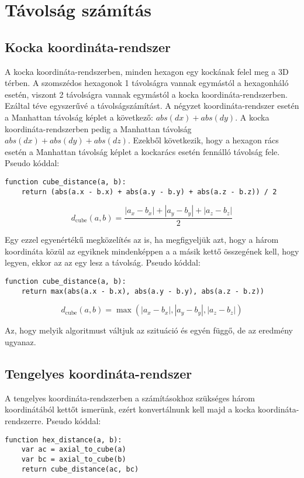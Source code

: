 \chapter{Távolság számítás}

\section{Kocka koordináta-rendszer}

A kocka koordináta-rendszerben, minden hexagon egy kockának felel meg a 3D térben. A szomszédos hexagonok 1 távolságra vannak egymástól a hexagonháló esetén, viszont 2 távolságra vannak egymástól a kocka koordináta-rendszerben. Ezáltal téve egyszerűvé a távolságszámítást. A négyzet koordináta-rendszer esetén a Manhattan távolság képlet a következő: $abs(dx) + abs(dy)$. A kocka koordináta-rendszerben pedig a Manhattan távolság $abs(dx) + abs(dy) + abs(dz)$. Ezekből következik, hogy a hexagon rács esetén a Manhattan távolság képlet a kockarács esetén fennálló távolság fele.
\newline
\newline Pseudo kóddal:
\begin{verbatim}
function cube_distance(a, b):
    return (abs(a.x - b.x) + abs(a.y - b.y) + abs(a.z - b.z)) / 2
\end{verbatim}    

$$
d_{\text{cube}}(a, b) =
\dfrac{|a_x - b_x| + |a_y - b_y| + |a_z - b_z|}{2}
$$

\noindent Egy ezzel egyenértékű megközelítés az is, ha megfigyeljük azt, hogy a három koordináta közül az egyiknek mindenképpen a a másik kettő összegének kell, hogy legyen, ekkor az az egy lesz a távolság. 
\newline
\newline Pseudo kóddal:
\begin{verbatim}
function cube_distance(a, b):
    return max(abs(a.x - b.x), abs(a.y - b.y), abs(a.z - b.z))
\end{verbatim}

$$
d_{\text{cube}}(a, b) =
\max(
|a_x - b_x|, |a_y - b_y|, |a_z - b_z|
)
$$

\noindent Az, hogy melyik algoritmust váltjuk az szituáció és egyén függő, de az eredmény ugyanaz.

\section{Tengelyes koordináta-rendszer}

A tengelyes koordináta-rendszerben a számításokhoz szükséges három koordinátából kettőt ismerünk, ezért konvertálnunk kell majd a kocka koordináta-rendszerre.
\newline
\newline Pseudo kóddal:
\begin{verbatim}
function hex_distance(a, b):
    var ac = axial_to_cube(a)
    var bc = axial_to_cube(b)
    return cube_distance(ac, bc)
\end{verbatim}    

